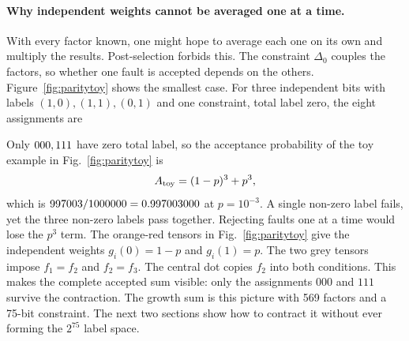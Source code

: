 \paragraph{Why independent weights cannot be averaged one at a time.} With every factor known, one might hope to average each one on its own and multiply the results. Post-selection forbids this. The constraint $\Delta_0$ couples the factors, so whether one fault is accepted depends on the others. Figure~\ref{fig:paritytoy} shows the smallest case. For three independent bits with labels $(1,0),(1,1),(0,1)$ and one constraint, total label zero, the eight assignments are
{\color{black}
\begin{center}\small\end{center}}
Only $000, 111$ have zero total label, so the acceptance probability of the toy example in Fig.~\ref{fig:paritytoy} is
\begin{equation}
 A_{\rm toy}=(1-p)^3+p^3,
 \label{eq:toy}
\end{equation}
which is $997003/1000000=0.997003000$ at $p=10^{-3}$. A single non-zero label fails, yet the three non-zero labels pass together. Rejecting faults one at a time would lose the $p^3$ term. The orange-red tensors in Fig.~\ref{fig:paritytoy} give the independent weights $g_i(0)=1-p$ and $g_i(1)=p$. The two grey tensors impose $f_1=f_2$ and $f_2=f_3$. The central dot copies $f_2$ into both conditions. This makes the complete accepted sum visible: only the assignments $000$ and $111$ survive the contraction. The growth sum is this picture with 569 factors and a 75-bit constraint. The next two sections show how to contract it without ever forming the $2^{75}$ label space.
{\color{black}
}

